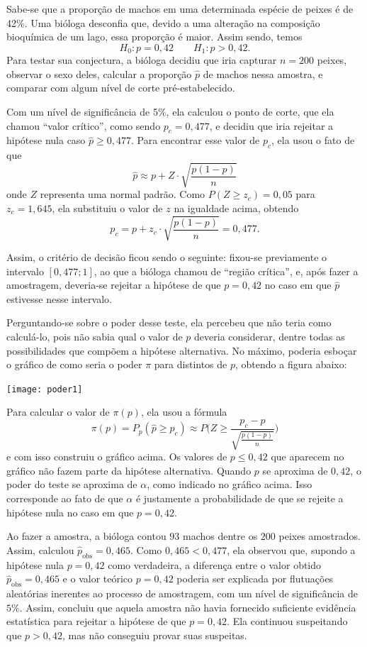 \documentclass[12pt,a4paper]{article}
\theoremstyle{plain}
\theoremstyle{definition}
\theoremstyle{remark}
\newenvironment{example}{\pushQED{\qed}\renewcommand{\qedsymbol}{\scriptsize$\triangle$}\examplex}{\popQED\endexamplex}
\begin{document}
\begin{example}
\label{exp:peixes}
Sabe-se que a proporção de machos em uma determinada espécie de peixes é de 42\%. Uma bióloga desconfia que, devido a uma alteração na composição bioquímica de um lago, essa proporção é maior.
Assim sendo, temos
\[
H_0:p=0,42
\qquad
H_1:p>0,42
.
\]
Para testar sua conjectura, a bióloga decidiu que iria capturar $n=200$ peixes, observar o sexo deles, calcular a proporção $\hat{p}$ de machos nessa amostra, e comparar com algum nível de corte pré-estabelecido.

Com um nível de significância de 5\%, ela calculou o ponto de corte, que ela chamou ``valor crítico'', como sendo $p_c=0,477$, e decidiu que iria rejeitar a hipótese nula caso $\hat{p} \geq 0,477$.
Para encontrar esse valor de $p_c$, ela usou o fato de que
\[
\hat{p}
\approx
p + Z \cdot \sqrt{\frac{p(1-p)}{n}}
\]
onde $Z$ representa uma normal padrão.
Como $P(Z\geq z_c)=0,05$ para $z_c = 1,645$, ela substituiu o valor de $z$ na igualdade acima, obtendo
\[
p_c
=
p + z_c \cdot \sqrt{\frac{p(1-p)}{n}}
=
0,477
.
\]

Assim, o critério de decisão ficou sendo o seguinte: fixou-se previamente o intervalo $[0,477; 1]$, ao que a bióloga chamou de ``região crítica'', e, após fazer a amostragem, deveria-se rejeitar a hipótese de que $p=0,42$ no caso em que $\hat{p}$ estivesse nesse intervalo.

Perguntando-se sobre o poder desse teste, ela percebeu que não teria como calculá-lo, pois não sabia qual o valor de $p$ deveria considerar, dentre todas as possibilidades que compõem a hipótese alternativa. No máximo, poderia esboçar o gráfico de como seria o poder $\pi$ para distintos de $p$, obtendo a figura abaixo:

\hfil \texttt{[image: poder1]}

Para calcular o valor de $\pi(p)$, ela usou a fórmula
\[
\pi(p) = P_p(\hat{p} \geq p_c) \approx P\Big(Z \geq \frac{p_c-p}{\sqrt{\frac{p(1-p)}{n}}}\Big)
\]
e com isso construiu o gráfico acima.
Os valores de $p \leq 0,42$ que aparecem no gráfico não fazem parte da hipótese alternativa.
Quando $p$ se aproxima de $0,42$, o poder do teste se aproxima de $\alpha$, como indicado no gráfico acima.
Isso corresponde ao fato de que $\alpha$ é justamente a probabilidade de que se rejeite a hipótese nula no caso em que $p=0,42$.

Ao fazer a amostra, a bióloga contou $93$ machos dentre os $200$ peixes amostrados.
Assim, calculou $\hat{p}_{\mathrm{obs}}=0,465$.
Como $0,465<0,477$, ela observou que, supondo a hipótese nula $p=0,42$ como verdadeira, a diferença entre o valor obtido $\hat{p}_{\mathrm{obs}}=0,465$ e o valor teórico $p=0,42$ poderia ser explicada por flutuações aleatórias inerentes ao processo de amostragem, com um nível de significância de $5\%$.
Assim, concluiu que aquela amostra não havia fornecido suficiente evidência estatística para rejeitar a hipótese de que $p=0,42$.
Ela continuou suspeitando que $p>0,42$, mas não conseguiu provar suas suspeitas.
\end{example}
\end{document}
